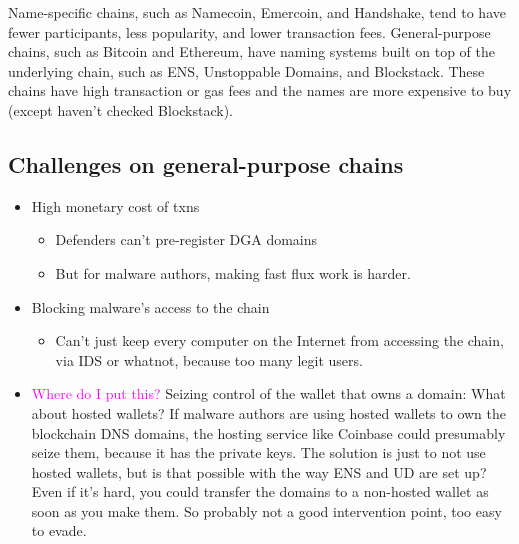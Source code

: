 \documentclass[10pt,sigconf,letterpaper]{acmart}
\newcommand{\randall}{\ding{110}\ding{43}\textcolor{magenta}}
\newcommand{\randall}{}
\begin{document}
Name-specific chains, such as Namecoin, Emercoin, and 
Handshake, tend to have fewer participants, less popularity, 
and lower transaction fees. General-purpose chains, such as 
Bitcoin and Ethereum, have naming systems built on top of the 
underlying chain, such as ENS, Unstoppable Domains, and 
Blockstack. These chains have high transaction or gas fees 
and the names are more expensive to buy (except haven't 
checked Blockstack). 

\subsection{Challenges on general-purpose chains}

\begin{itemize}
	\item High monetary cost of txns
	\begin{itemize}
		\item Defenders can't pre-register DGA domains
		\item But for malware authors, making fast flux work 
		is harder. 
	\end{itemize}
	\item Blocking malware's access to the chain
	\begin{itemize}
		\item Can't just keep every computer on the Internet 
		from accessing the chain, via IDS or whatnot, because 
		too many legit users.
	\end{itemize}
	\item \randall{Where do I put this?} Seizing control of 
	the wallet that owns a domain: 
	What about hosted wallets? If malware authors are using 
	hosted wallets to own the blockchain DNS domains, the 
	hosting service like Coinbase could presumably seize 
	them, because it has the private keys. The solution is 
	just to not use hosted wallets, but is that possible with 
	the way ENS and UD are set up? Even if it's hard, you 
	could transfer the domains to a non-hosted wallet as soon 
	as you make them. So probably not a good intervention 
	point, too easy to evade. 
\end{itemize}
\end{document}
